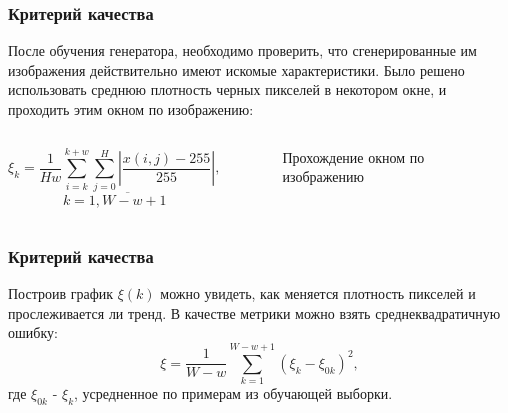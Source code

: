\documentclass[12pt]{beamer}
\begin{document}
\begin{frame}\frametitle{Критерий качества}
	После обучения генератора, необходимо проверить, что сгенерированные им изображения действительно имеют искомые характеристики. Было решено использовать среднюю плотность черных пикселей в некотором окне, и проходить этим окном по изображению:
	\begin{columns}
			$$\xi_k = \frac{1}{H w}{\sum_{i=k}^{k+w} \sum_{j=0}^{H}\left| \frac{x(i, j) - 255}{255} \right|}, $$$$k = \overline{1, W - w + 1} $$
			\begin{figure}
				\caption{Прохождение окном по изображению}
			\end{figure}
	\end{columns}
\end{frame}

\begin{frame}\frametitle{Критерий качества}
	Построив график $\xi(k)$ можно увидеть, как меняется плотность пикселей и прослеживается ли тренд. В качестве метрики можно взять среднеквадратичную ошибку:
	$$ \xi = \frac{1}{W-w}\sum_{k=1}^{W-w+1} (\xi_k - \xi_{0k})^2,$$
	где $\xi_{0k}$ - $\xi_k$, усредненное по примерам из обучающей выборки.
\end{frame}
\end{document}
